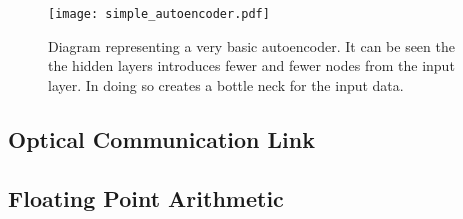     \begin{figure}[H]
        \centering
        \texttt{[image: simple\_autoencoder.pdf]}
        \caption{Diagram representing a very basic autoencoder. It can be seen the the hidden layers introduces fewer and fewer nodes from the input layer. In doing so creates a bottle neck for the input data.}
        \label{fig:autoencoder}
    \end{figure}

\subsection{Optical Communication Link}
\subsection{Floating Point Arithmetic}